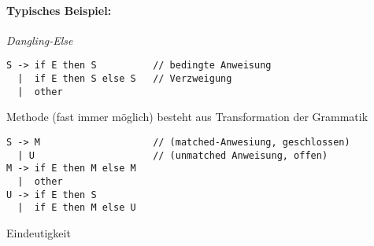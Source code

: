 \begin{itemize}
\begin{itemize}
  \paragraph*{Typisches Beispiel:} \emph{Dangling-Else}
    \begin{verbatim}
S -> if E then S          // bedingte Anweisung
  |  if E then S else S   // Verzweigung
  |  other
    \end{verbatim}
    Methode (fast immer möglich) besteht aus Transformation der Grammatik
    \begin{verbatim}
S -> M                    // (matched-Anwesiung, geschlossen)
  | U                     // (unmatched Anweisung, offen)
M -> if E then M else M
  |  other
U -> if E then S
  |  if E then M else U
    \end{verbatim}
    Eindeutigkeit
  \end{itemize}
\end{itemize}



